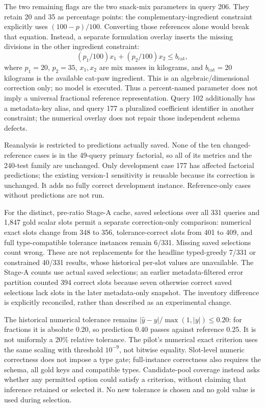 The two remaining flags are the two snack-mix parameters in query 206.
They retain 20 and 35 as percentage points: the complementary-ingredient
constraint explicitly uses $(100-p)/100$. Converting those references alone
would break that equation. Instead, a separate formulation overlay inserts
the missing divisions in the other ingredient constraint:
\begin{equation}
 (p_1/100)x_1+(p_2/100)x_2\leq b_{\mathrm{cat}},
 \label{eq:snack-overlay}
\end{equation}
where $p_1=20$, $p_2=35$, $x_1,x_2$ are mix masses in kilograms, and
$b_{\mathrm{cat}}=20$ kilograms is the available cat-paw ingredient.
This is an algebraic/dimensional correction only; no model is executed.
Thus a percent-named parameter does not imply a universal fractional
reference representation. Query 102 additionally has a metadata-key alias,
and query 177 a pluralized coefficient identifier in another constraint;
the numerical overlay does not repair those independent schema defects.

Reanalysis is restricted to predictions actually saved. None of the ten
changed-reference cases is in the 49-query primary factorial, so all of its
metrics and the 240-test family are unchanged. Only development case 177
has affected factorial predictions; the existing version-1 sensitivity is
reusable because its correction is unchanged. It adds no fully correct
development instance. Reference-only cases without predictions are not run.

For the distinct, pre-ratio Stage-A cache, saved selections over all 331
queries and 1,847 gold scalar slots permit a separate correction-only
comparison: numerical exact slots change from 348 to 356, tolerance-correct
slots from 401 to 409, and full type-compatible tolerance instances remain
6/331. Missing saved selections count wrong. These are not replacements
for the headline typed-greedy 7/331 or constrained 40/331 results, whose
historical per-slot values are unavailable. The Stage-A counts use actual
saved selections; an earlier metadata-filtered error partition counted 394
correct slots because seven otherwise correct saved selections lack slots
in the later metadata-only snapshot. The inventory difference is explicitly
reconciled, rather than described as an experimental change.

The historical numerical tolerance remains
$|\hat y-y|/\max(1,|y|)\leq0.20$: for fractions it is absolute 0.20,
so prediction 0.40 passes against reference 0.25. It is not uniformly a
20\% relative tolerance. The pilot's numerical exact criterion uses the
same scaling with threshold $10^{-9}$, not bitwise equality. Slot-level
numeric correctness does not impose a type gate; full-instance correctness
also requires the schema, all gold keys and compatible types. Candidate-pool
coverage instead asks whether any permitted option could satisfy a criterion,
without claiming that inference retained or selected it. No new tolerance
is chosen and no gold value is used during selection.
